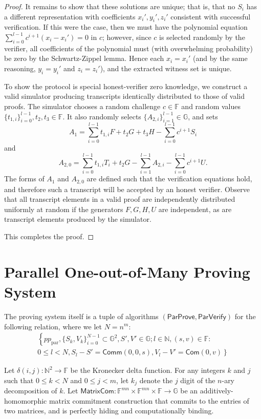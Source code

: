 \documentclass{llncs}
\newcommand{\G}{\mathbb{G}}
\newcommand{\F}{\mathbb{F}}
\newcommand{\func}[1]{\mathsf{#1}}
\newcommand{\com}{\func{Com}}
\newcommand{\comm}{\func{Comm}}
\begin{document}
\begin{proof}
It remains to show that these solutions are unique; that is, that no $S_i$ has a different representation with coefficients $x_i',y_i',z_i'$ consistent with successful verification.
If this were the case, then we must have the polynomial equation $\sum_{i=0}^{l-1} c^{i+1}(x_i - x_i') = 0$ in $c$; however, since $c$ is selected randomly by the verifier, all coefficients of the polynomial must (with overwhelming probability) be zero by the Schwartz-Zippel lemma.
Hence each $x_i = x_i'$ (and by the same reasoning, $y_i = y_i'$ and $z_i = z_i'$), and the extracted witness set is unique.

To show the protocol is special honest-verifier zero knowledge, we construct a valid simulator producing transcripts identically distributed to those of valid proofs.
The simulator chooses a random challenge $c \in \F$ and random values $\{t_{1,i}\}_{i=0}^{l-1}, t_2, t_3 \in \F$.
It also randomly selects $\{A_{2,i}\}_{i=1}^{l-1} \in \G$, and sets $$A_1 = \sum_{i=0}^{l-1} t_{1,i} F + t_2 G + t_3 H - \sum_{i=0}^{l-1} c^{i+1} S_i$$ and $$A_{2,0} = \sum_{i=0}^{l-1} t_{1,i} T_i + t_2 G - \sum_{i=1}^{l-1} A_{2,i} -  \sum_{i=0}^{l-1} c^{i+1} U.$$
The forms of $A_1$ and $A_{2,0}$ are defined such that the verification equations hold, and therefore such a transcript will be accepted by an honest verifier.
Observe that all transcript elements in a valid proof are independently distributed uniformly at random if the generators $F,G,H,U$ are independent, as are transcript elements produced by the simulator.

This completes the proof.
\end{proof}


\section{Parallel One-out-of-Many Proving System}
\label{app:parallel}

The proving system itself is a tuple of algorithms $(\func{ParProve},\func{ParVerify})$ for the following relation, where we let $N = n^m$:
\begin{multline*}
\left\{ pp_{\text{par}}, \{S_k,V_k\}_{i=0}^{N-1} \subset \G^2, S',V' \in \G ; l \in \mathbb{N}, (s,v) \in \F : \right. \\
\left. 0 \leq l < N, S_l - S' = \comm(0,0,s), V_l - V' = \com(0,v) \right\}
\end{multline*}

Let $\delta(i,j): \mathbb{N}^2 \to \F$ be the Kronecker delta function.
For any integers $k$ and $j$ such that $0 \leq k < N$ and $0 \leq j < m$, let $k_j$ denote the $j$ digit of the $n$-ary decomposition of $k$.
Let $\func{MatrixCom}: \F^{mn} \times \F^{mn} \times \F \to \G$ be an additively-homomorphic matrix commitment construction that commits to the entries of two matrices, and is perfectly hiding and computationally binding.
\end{document}
